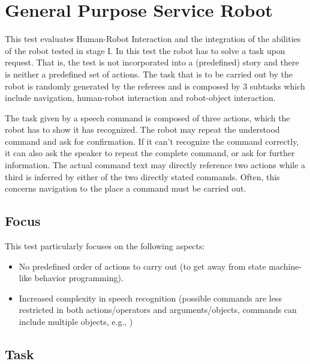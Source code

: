 \section{General Purpose Service Robot}

This test evaluates Human-Robot Interaction and the integration of the abilities of the robot tested in stage I. In this test the robot has to solve a task upon request. That is, the test is not incorporated into a (predefined) story and there is neither a predefined set of actions. The task that is to be carried out by the robot is randomly generated by the referees and is composed by 3 subtasks which include navigation, human-robot interaction and robot-object interaction.

The task given by a speech command is composed of three actions, which the robot has to show it has recognized. The robot may repeat the understood command and ask for confirmation. If it can't recognize the command correctly, it can also ask the speaker to repeat the complete command, or ask for further information.
The actual command text may directly reference two actions while a third is inferred by either of the two directly stated commands. 
Often, this concerns navigation to the place a command must be carried out.

\subsection{Focus}
This test particularly focuses on the following aspects:
\begin{itemize}
	\item No predefined order of actions to carry out (to get away from state machine-like behavior programming).
	\item Increased complexity in speech recognition (possible commands are less restricted in both actions/operators and arguments/objects, commands can include multiple objects, e.g., )
\end{itemize}

\subsection{Task}

